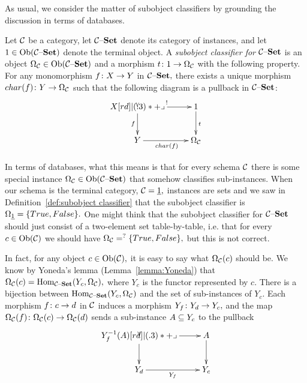 \documentclass[CT4S-EN-RU]{subfiles}
\begin{document}
\begin{blockRUS}
\end{blockRUS}

\begin{blockENG}
As usual, we consider the matter of subobject classifiers by grounding the discussion in terms of databases.
\end{blockENG}

\begin{blockRUS}
\end{blockRUS}

\begin{definitionENG}
Let $\mcC$ be a category, let $\mcC\set$ denote its category of instances, and let $1\in\Ob(\mcC\set)$ denote the terminal object. A {\em subobject classifier for $\mcC\set$} is an object $\Omega_\mcC\in\Ob(\mcC\set)$ and a morphism $t\taking 1\to\Omega_\mcC$ with the following property. For any monomorphism $f\taking X\to Y$ in $\mcC\set,$ there exists a unique morphism $char(f)\taking Y\to\Omega_\mcC$ such that the following diagram is a pullback in $\mcC\set$:
$$
\xymatrix@=25pt{X\ar[r]^{!}\ar[d]_f\ullimit&1\ar[d]^t\\Y\ar[r]_{char(f)}&\Omega_\mcC
}
$$
\end{definitionENG}

\begin{definitionRUS}
\end{definitionRUS}

\begin{blockENG}
In terms of databases, what this means is that for every schema $\mcC$ there is some special instance $\Omega_\mcC\in\Ob(\mcC\set)$ that somehow classifies sub-instances. When our schema is the terminal category, $\mcC=\ul{1},$ instances are sets and we saw in Definition~\ref{def:subobject classifier} that the subobject classifier is $\Omega_{\ul{1}}=\{True, False\}.$ One might think that the subobject classifier for $\mcC\set$ should just consist of a two-element set table-by-table, i.e. that for every $c\in\Ob(\mcC)$ we should have $\Omega_{\mcC}=^?\{True,False\},$ but this is not correct. 
\end{blockENG}

\begin{blockRUS}
\end{blockRUS}

\begin{blockENG}
In fact, for any object $c\in\Ob(\mcC),$ it is easy to say what $\Omega_\mcC(c)$ should be. We know by Yoneda's lemma (Lemma~\ref{lemma:Yoneda}) that $\Omega_\mcC(c)=\Hom_{\mcC\set}(Y_c,\Omega_\mcC),$ where $Y_c$ is the functor represented by $c.$ There is a bijection between $\Hom_{\mcC\set}(Y_c,\Omega_\mcC)$ and the set of sub-instances of $Y_c.$ Each morphism $f\taking c\to d$ in $\mcC$ induces a morphism $Y_f\taking Y_d\to Y_c,$ and the map $\Omega_\mcC(f)\taking\Omega_\mcC(c)\to\Omega_\mcC(d)$ sends a sub-instance $A\ss Y_c$ to the pullback 
$$
\xymatrix{Y_f^\m1(A)\ar[r]\ar[d]\ullimit&A\ar[d]\\Y_d\ar[r]_{Y_f}&Y_c}
$$
\end{blockENG}
\end{document}
